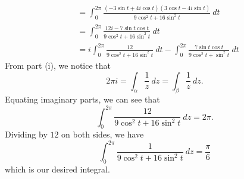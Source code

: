 \documentclass[a4paper]{article}
\begin{document}
\begin{solution}[a]
\begin{enumerate}
\begin{align*}
                                                         &= \int_{ 0 }^{ 2 \pi  } \frac{ (-3 \sin t + 4 i \cos t ) (3 \cos t - 4i \sin t ) }{ 9 \cos^{2} t + 16 \sin^{2} t  }  \ dt \\
                                                         &= \int_{ 0 }^{ 2\pi  }  \frac{ 12i - 7 \sin t \cos t  }{ 9 \cos^{2} t + 16 \sin^{2}t  }  \ dt \\
                                                         &= i \int_{ 0 }^{ 2\pi  } \frac{ 12 }{ 9 \cos^{2} t + 16 \sin^{2}t  } \ dt - \int_{ 0 }^{ 2\pi  } \frac{ 7 \sin t \cos t  }{ 9 \cos^{2}t + \sin^{2} t  }  \ dt 
           \end{align*}
           From part (i), we notice that 
           \[   2 \pi i = \int_{ \alpha  }^{  } \frac{ 1 }{ z }   \ dz = \int_{ \beta  }^{  }  \frac{ 1 }{ z }  \ dz. \]
           Equating imaginary parts, we can see that
           \[ \int_{ 0 }^{ 2 \pi  } \frac{ 12 }{ 9 \cos^{2}t + 16 \sin^{2} t  }  \ dz = 2 \pi.  \]
           Dividing by \( 12  \) on both sides, we have
           \[  \int_{ 0 }^{ 2 \pi  } \frac{ 1 }{ 9 \cos^{2}t + 16 \sin^{2} t  }  \ dz = \frac{ \pi }{ 6 } \]
           which is our desired integral.
   \end{enumerate} 
\end{solution}
\end{document}
